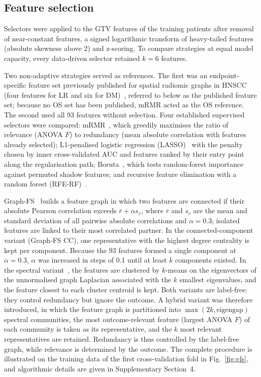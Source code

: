 \documentclass[11pt,a4paper]{article}
\begin{document}
\subsection{Feature selection}
Selectors were applied to the GTV features of the training patients after removal of near-constant features, a signed logarithmic transform of heavy-tailed features (absolute skewness above 2) and z-scoring. To compare strategies at equal model capacity, every data-driven selector retained $k=6$ features.

Two non-adaptive strategies served as references. The first was an endpoint-specific feature set previously published for spatial radiomic graphs in HNSCC (four features for LR and six for DM)~\cite{bae2025spatial}, referred to below as the published feature set; because no OS set has been published, mRMR acted as the OS reference. The second used all 93 features without selection. Four established supervised selectors were compared: mRMR~\cite{peng2005mrmr}, which greedily maximises the ratio of relevance (ANOVA $F$) to redundancy (mean absolute correlation with features already selected); L1-penalised logistic regression (LASSO)~\cite{tibshirani1996lasso} with the penalty chosen by inner cross-validated AUC and features ranked by their entry point along the regularisation path; Boruta~\cite{kursa2010boruta}, which tests random-forest importance against permuted shadow features; and recursive feature elimination with a random forest (RFE-RF)~\cite{guyon2002rfe}.

Graph-FS~\cite{moradmand2025graphfs} builds a feature graph in which two features are connected if their absolute Pearson correlation exceeds $\bar r+\alpha s_r$, where $\bar r$ and $s_r$ are the mean and standard deviation of all pairwise absolute correlations and $\alpha=0.3$; isolated features are linked to their most correlated partner. In the connected-component variant (Graph-FS CC), one representative with the highest degree centrality is kept per component. Because the 93 features formed a single component at $\alpha=0.3$, $\alpha$ was increased in steps of 0.1 until at least $k$ components existed. In the spectral variant~\cite{vonluxburg2007spectral}, the features are clustered by $k$-means on the eigenvectors of the unnormalised graph Laplacian associated with the $k$ smallest eigenvalues, and the feature closest to each cluster centroid is kept. Both variants are label-free: they control redundancy but ignore the outcome. A hybrid variant was therefore introduced, in which the feature graph is partitioned into $\max(2k,\text{eigengap})$ spectral communities, the most outcome-relevant feature (largest ANOVA $F$) of each community is taken as its representative, and the $k$ most relevant representatives are retained. Redundancy is thus controlled by the label-free graph, while relevance is determined by the outcome. The complete procedure is illustrated on the training data of the first cross-validation fold in Fig.~\ref{fig:gfs}, and algorithmic details are given in Supplementary Section~4.
\end{document}
